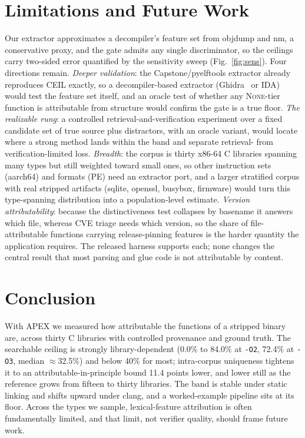 \documentclass[conference]{IEEEtran}
\begin{document}
\section{Limitations and Future Work}
Our extractor approximates a decompiler's feature set from objdump and nm, a
conservative proxy, and the gate admits any single discriminator, so the ceilings
carry two-sided error quantified by the sensitivity sweep (Fig.~\ref{fig:sens}). Four
directions remain. \emph{Deeper validation}: the Capstone/pyelftools extractor already
reproduces CEIL exactly, so a decompiler-based extractor (Ghidra~\cite{ghidra} or IDA)
would test the feature set itself, and an oracle test of whether any \textsc{None}-tier
function is attributable from structure would confirm the gate is a true floor.
\emph{The realizable rung}: a controlled
retrieval-and-verification experiment over a fixed candidate set of true source plus
distractors, with an oracle variant, would locate where a strong method lands within the
band and separate retrieval- from verification-limited loss. \emph{Breadth}: the corpus
is thirty x86-64 C libraries spanning many types but still weighted toward small ones,
so other instruction sets (aarch64) and formats (PE) need an extractor port, and a larger
stratified corpus with real stripped artifacts (sqlite, openssl, busybox, firmware) would
turn this type-spanning distribution into a population-level estimate. \emph{Version
attributability}: because the distinctiveness test collapses by basename it answers which
file, whereas CVE triage needs which version, so the share of file-attributable functions
carrying release-pinning features is the harder quantity the application requires. The
released harness supports each; none changes the central result that most parsing and
glue code is not attributable by content.

\section{Conclusion}
With APEX we measured how attributable the functions of a stripped binary are, across
thirty C libraries with controlled provenance and ground truth. The searchable ceiling
is strongly library-dependent (0.0\% to 84.0\% at \texttt{-O2}, 72.4\% at \texttt{-O3},
median $\approx$32.5\%) and below 40\% for most; intra-corpus uniqueness tightens it to an
attributable-in-principle bound 11.4 points lower, and lower still as the reference grows
from fifteen to thirty libraries. The band is stable under static linking and shifts
upward under clang, and a worked-example pipeline sits at its floor. Across the types we
sample, lexical-feature attribution is often fundamentally limited, and that limit, not
verifier quality, should frame future work.
\end{document}
